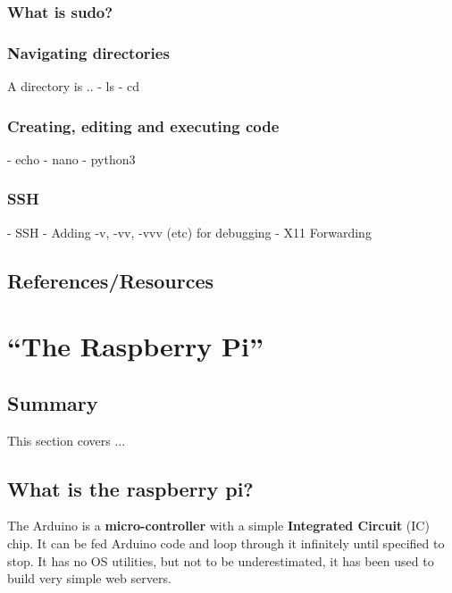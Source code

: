 \documentclass[a4paper, 10pt]{article}
\begin{document}
		\subsubsection{What is sudo?}

		\subsubsection{Navigating directories}
		A directory is ..
            - ls
            - cd

            \subsubsection{Creating, editing and executing code}
            - echo
            - nano
            - python3

            \subsubsection{SSH}
            - SSH
            - Adding -v, -vv, -vvv (etc) for debugging
            - X11 Forwarding

	\subsection{References/Resources}
\pagebreak


\section{``The Raspberry Pi''}
    \subsection*{Summary}
    This section covers ...
	
    \subsection{What is the raspberry pi?}

    The Arduino is a \textbf{micro-controller} with a simple \textbf{Integrated Circuit} (IC) chip. It can be fed Arduino code and loop through it infinitely until specified to stop. It has no OS utilities, but not to be underestimated, it has been used to build very simple web servers. \\
    
\end{document}
